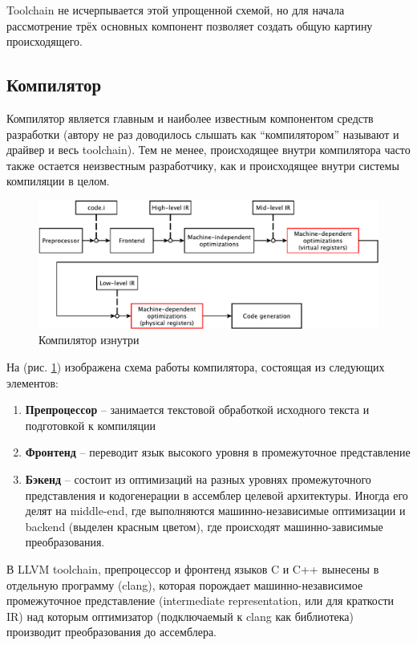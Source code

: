 \documentclass[a4paper,12pt,oneside]{article}
\begin{document}
Toolchain не исчерпывается этой упрощенной схемой, но для начала рассмотрение трёх основных компонент позволяет создать общую картину происходящего.

\pagebreak
\subsection{Компилятор}\label{subsec:Compiler}

Компилятор является главным и наиболее известным компонентом средств разработки (автору не раз доводилось слышать как ``компилятором'' называют и драйвер и весь toolchain). Тем не менее, происходящее внутри компилятора часто также остается неизвестным разработчику, как и происходящее внутри системы компиляции в целом.

\begin{figure}[ht]
\centering
\includegraphics[width=1.0\textwidth]{illustrations/compiler-crop.pdf}
\caption{Компилятор изнутри}
\label{fig:compiler_scheme}
\end{figure}

На (рис. \ref{fig:compiler_scheme}) изображена схема работы компилятора, состоящая из следующих элементов:

\begin{enumerate}
\item \textbf{Препроцессор} -- занимается текстовой обработкой исходного текста и подготовкой к компиляции
\item \textbf{Фронтенд} -- переводит язык высокого уровня в промежуточное представление
\item \textbf{Бэкенд} -- состоит из оптимизаций на разных уровнях промежуточного представления и кодогенерации в ассемблер целевой архитектуры. Иногда его делят на middle-end, где выполняются машинно-независимые оптимизации и backend (выделен красным цветом), где происходят машинно-зависимые преобразования.
\end{enumerate}

В LLVM toolchain, препроцессор и фронтенд языков C и C++ вынесены в отдельную программу (clang), которая порождает машинно-независимое промежуточное представление (intermediate representation, или для краткости IR) над которым оптимизатор (подключаемый к clang как библиотека) производит преобразования до ассемблера. 
\end{document}
